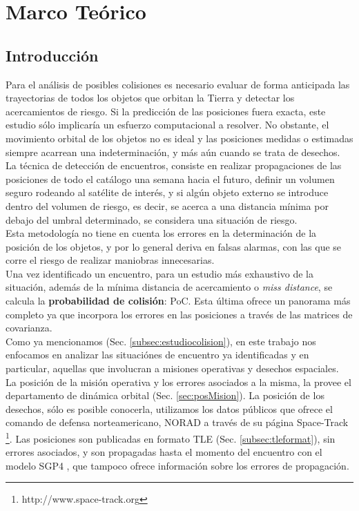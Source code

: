 \chapter{Marco Teórico}
\label{chap:marcoteorico}
\section{Introducci\'on}

Para el an\'alisis de posibles colisiones es necesario evaluar de forma anticipada las trayectorias de todos los objetos que orbitan la Tierra y detectar los acercamientos de riesgo. Si la predicci\'on de las posiciones fuera exacta, este estudio s\'olo implicar\'ia un esfuerzo computacional a resolver. No obstante, el movimiento orbital de los objetos no es ideal y las posiciones medidas o estimadas siempre acarrean una indeterminaci\'on, y m\'as a\'un cuando se trata de desechos.\\

La t\'ecnica de detecci\'on de encuentros, consiste en realizar propagaciones de las posiciones de todo el cat\'alogo una semana hacia el futuro, definir un volumen seguro rodeando al sat\'elite de inter\'es, y si alg\'un objeto externo se introduce dentro del volumen de riesgo, es decir, se acerca a una distancia m\'inima por debajo del umbral determinado, se considera una situaci\'on de riesgo.\\ Esta metodolog\'ia no tiene en cuenta los errores en la determinaci\'on de la posici\'on de los objetos, y por lo general deriva en falsas alarmas, con las que se corre el riesgo de realizar maniobras innecesarias.\\
Una vez identificado un encuentro, para un estudio m\'as exhaustivo de la situaci\'on, adem\'as de la m\'inima distancia de acercamiento o {\it{miss distance}}, se calcula la {\bf{probabilidad de colisi\'on}}: PoC.  Esta \'ultima ofrece un panorama m\'as completo ya que incorpora los errores en las posiciones a trav\'es de las matrices de covarianza.\\

Como ya mencionamos (Sec. \ref{subsec:estudiocolision}), en este trabajo nos enfocamos en analizar las situaci\'ones de encuentro ya identificadas y en particular, aquellas que involucran a misiones operativas y desechos espaciales.\\

La posici\'on de la misi\'on operativa y los errores asociados a la misma, la provee el departamento de din\'amica orbital (Sec. \ref{sec:posMision}).
La posici\'on de los desechos, s\'olo es posible conocerla, utilizamos los datos p\'ublicos que ofrece el comando de defensa norteamericano, \ac{NORAD} a trav\'es de su p\'agina Space-Track {\footnote{http://www.space-track.org}}. Las posiciones son publicadas en formato \ac{TLE} (Sec. \ref{subsec:tleformat}), sin errores asociados, y son propagadas hasta el momento del encuentro con el modelo SGP4  \citep{hoots1980spacetrack}, que tampoco ofrece informaci\'on sobre los errores de propagaci\'on.\\

